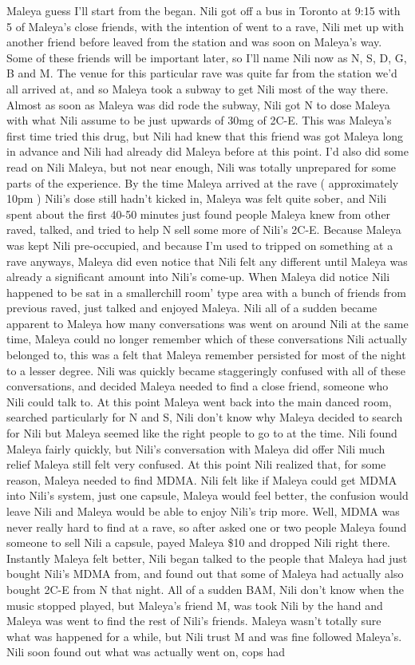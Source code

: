\documentclass[12pt]{book}
\begin{document}
Maleya guess I'll start from the began. Nili got off a bus in Toronto at 9:15 with 5 of Maleya's close friends, with the intention of went to a rave, Nili met up with another friend before leaved from the station and was soon on Maleya's way. Some of these friends will be important later, so I'll name Nili now as N, S, D, G, B and M. The venue for this particular rave was quite far from the station we'd all arrived at, and so Maleya took a subway to get Nili most of the way there. Almost as soon as Maleya was did rode the subway, Nili got N to dose Maleya with what Nili assume to be just upwards of 30mg of 2C-E. This was Maleya's first time tried this drug, but Nili had knew that this friend was got Maleya long in advance and Nili had already did Maleya before at this point. I'd also did some read on Nili Maleya, but not near enough, Nili was totally unprepared for some parts of the experience. By the time Maleya arrived at the rave ( approximately 10pm ) Nili's dose still hadn't kicked in, Maleya was felt quite sober, and Nili spent about the first 40-50 minutes just found people Maleya knew from other raved, talked, and tried to help N sell some more of Nili's 2C-E. Because Maleya was kept Nili pre-occupied, and because I'm used to tripped on something at a rave anyways, Maleya did even notice that Nili felt any different until Maleya was already a significant amount into Nili's come-up. When Maleya did notice Nili happened to be sat in a smallerchill room' type area with a bunch of friends from previous raved, just talked and enjoyed Maleya. Nili all of a sudden became apparent to Maleya how many conversations was went on around Nili at the same time, Maleya could no longer remember which of these conversations Nili actually belonged to, this was a felt that Maleya remember persisted for most of the night to a lesser degree. Nili was quickly became staggeringly confused with all of these conversations, and decided Maleya needed to find a close friend, someone who Nili could talk to. At this point Maleya went back into the main danced room, searched particularly for N and S, Nili don't know why Maleya decided to search for Nili but Maleya seemed like the right people to go to at the time. Nili found Maleya fairly quickly, but Nili's conversation with Maleya did offer Nili much relief Maleya still felt very confused. At this point Nili realized that, for some reason, Maleya needed to find MDMA. Nili felt like if Maleya could get MDMA into Nili's system, just one capsule, Maleya would feel better, the confusion would leave Nili and Maleya would be able to enjoy Nili's trip more. Well, MDMA was never really hard to find at a rave, so after asked one or two people Maleya found someone to sell Nili a capsule, payed Maleya \$10 and dropped Nili right there. Instantly Maleya felt better, Nili began talked to the people that Maleya had just bought Nili's MDMA from, and found out that some of Maleya had actually also bought 2C-E from N that night. All of a sudden BAM, Nili don't know when the music stopped played, but Maleya's friend M, was took Nili by the hand and Maleya was went to find the rest of Nili's friends. Maleya wasn't totally sure what was happened for a while, but Nili trust M and was fine followed Maleya's. Nili soon found out what was actually went on, cops had 
\end{document}
